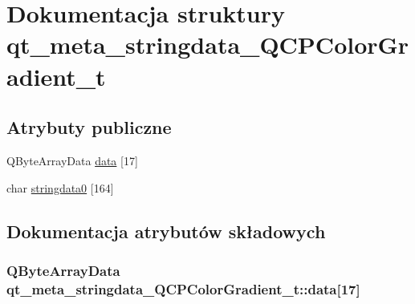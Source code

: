 \hypertarget{structqt__meta__stringdata___q_c_p_color_gradient__t}{}\section{Dokumentacja struktury qt\+\_\+meta\+\_\+stringdata\+\_\+\+Q\+C\+P\+Color\+Gradient\+\_\+t}
\label{structqt__meta__stringdata___q_c_p_color_gradient__t}
\subsection*{Atrybuty publiczne}
\begin{DoxyCompactItemize}
\item 
Q\+Byte\+Array\+Data \hyperlink{structqt__meta__stringdata___q_c_p_color_gradient__t_a4b1142eed666e972a34a24fbcd9338e7}{data} \mbox{[}17\mbox{]}
\item 
char \hyperlink{structqt__meta__stringdata___q_c_p_color_gradient__t_af6991165899703d0e9df570ab79718c3}{stringdata0} \mbox{[}164\mbox{]}
\end{DoxyCompactItemize}


\subsection{Dokumentacja atrybutów składowych}
\subsubsection[{\texorpdfstring{data}{data}}]{\setlength{\rightskip}{0pt plus 5cm}Q\+Byte\+Array\+Data qt\+\_\+meta\+\_\+stringdata\+\_\+\+Q\+C\+P\+Color\+Gradient\+\_\+t\+::data\mbox{[}17\mbox{]}}\hypertarget{structqt__meta__stringdata___q_c_p_color_gradient__t_a4b1142eed666e972a34a24fbcd9338e7}{}\label{structqt__meta__stringdata___q_c_p_color_gradient__t_a4b1142eed666e972a34a24fbcd9338e7}
